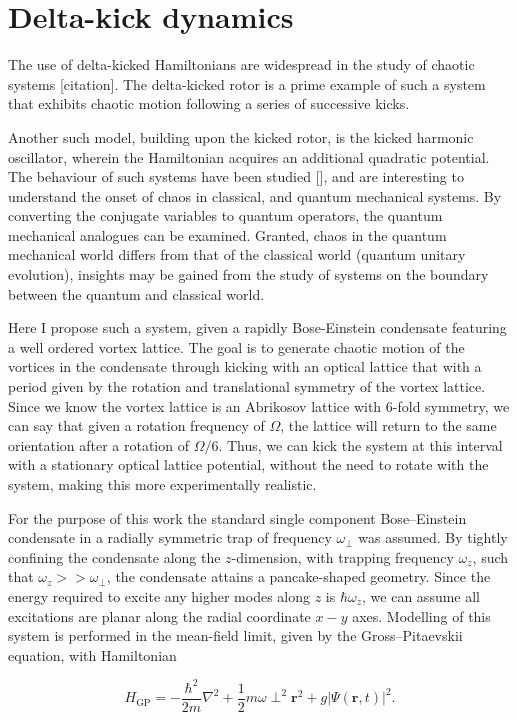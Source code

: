\section{Delta-kick dynamics}
The use of delta-kicked Hamiltonians are widespread in the study of chaotic systems [citation]. The delta-kicked rotor is a prime example of such a system that exhibits chaotic motion following a series of successive kicks.

Another such model, building upon the kicked rotor, is the kicked harmonic oscillator, wherein the Hamiltonian acquires an additional quadratic potential. The behaviour of such systems have been studied [], and are interesting to understand the onset of chaos in classical, and quantum mechanical systems. By converting the conjugate variables to quantum operators, the quantum mechanical analogues can be examined. Granted, chaos in the quantum mechanical world differs from that of the classical world (quantum unitary evolution), insights may be gained from the study of systems on the boundary between the quantum and classical world.

Here I propose such a system, given a rapidly Bose-Einstein condensate featuring a well ordered vortex lattice. The goal is to generate chaotic motion of the vortices in the condensate through kicking with an optical lattice that with a period given by the rotation and translational symmetry of the vortex lattice. Since we know the vortex lattice is an Abrikosov lattice with 6-fold symmetry, we can say that given a rotation frequency of $\Omega$, the lattice will return to the same orientation after a rotation of $\Omega/6$. Thus, we can kick the system at this interval with a stationary optical lattice potential, without the need to rotate with the system, making this more experimentally realistic.




For the purpose of this work the standard single component Bose--Einstein condensate in a radially symmetric trap of frequency $\omega_\perp$ was assumed. By tightly confining the condensate along the $z$-dimension, with trapping frequency $\omega_z$, such that $\omega_z >> \omega_\perp$, the condensate attains a pancake-shaped geometry. Since the energy required to excite any higher modes along $z$ is $\hbar\omega_z$, we can assume all excitations are planar along the radial coordinate $x-y$ axes. Modelling of this system is performed in the  mean-field limit, given by the Gross--Pitaevskii equation, with Hamiltonian

\begin{equation}\label{eqn:gpe_h0}
	H_{\mathrm{GP}} = -\frac{\hbar^2}{2m}\nabla^2 + \frac{1}{2}m\omega\perp^2\mathbf{r}^2 + g\vert\Psi(\mathbf{r},t)\vert^2.
\end{equation}

